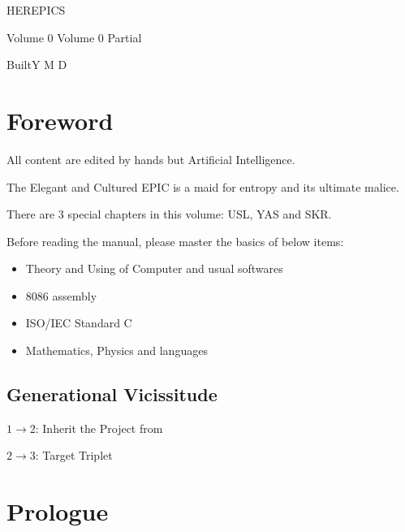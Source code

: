\begin{sloppypar}
\author{dosconio}
{
\begin{center}
	{
	\fontsize{48pt}{0}\selectfont\textcolor[rgb]{1, 0, 0.618}{HEREPICS}}
\end{center}
}
\ifdetail{}
{\hfill\sc\fontsize{24pt}{0}\selectfont\textcolor[rgb]{1, 0, 0.618}{Volume 0}}
\else
{\hfill\sc\fontsize{24pt}{0}\selectfont\textcolor[rgb]{1, 0, 0.618}{Volume 0} Partial}
\fi

{\hfill\sc\fontsize{24pt}{0}\selectfont\textcolor[rgb]{1, 0, 0.618}{BuiltY\number\year{} M\number\month{} D\number\day{}}}


\renewcommand{\contentsname}{Contents}
\newpage %
\setcounter{tocdepth}{3}
\tableofcontents

\section{Foreword} %

All content\cite{HEREPIC} are edited by hands but Artificial Intelligence.

The Elegant and Cultured EPIC is a maid for entropy and its ultimate malice.

There are 3 special chapters in this volume: USL, YAS and SKR.

Before reading the manual, please master the basics of below items:
\begin{itemize}
	\item Theory and Using of Computer and usual softwares 
	\item 8086 assembly
	\item ISO/IEC Standard C
	\item Mathematics, Physics and languages
\end{itemize}

\subsection{Generational Vicissitude}

$1 \rightarrow 2$: Inherit the Project from 

$2 \rightarrow 3$: Target Triplet

\section{Prologue} %




\end{sloppypar}
